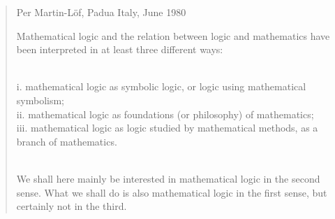 \documentclass[10pt]{beamer}
\begin{document}
\begin{frame}

\begin{quote}{Per Martin-Löf, Padua Italy, June 1980}

Mathematical logic and the relation between logic and mathematics have been
interpreted in at least three different ways:
\newline

\\
i. mathematical logic as symbolic logic, or logic using mathematical symbolism; \\
ii. mathematical logic as foundations (or philosophy) of mathematics;\\
iii. mathematical logic as logic studied by mathematical methods, as a branch of mathematics.
\newline

\\
We shall here mainly be interested in mathematical logic in the second sense.
What we shall do is also mathematical logic in the first sense, but certainly
not in the third.
\end{quote}
\end{frame}
\end{document}
